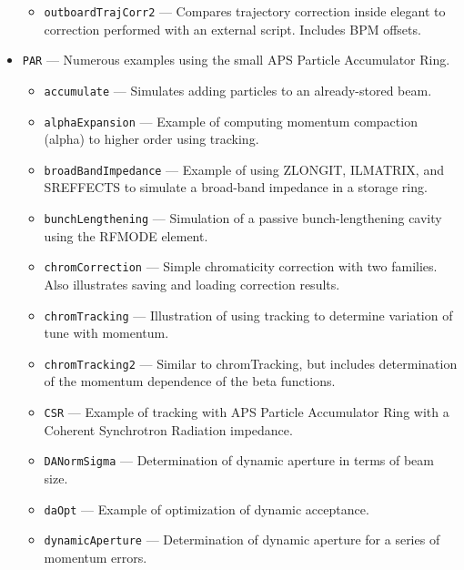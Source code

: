 \begin{itemize}
\begin{itemize}
\item \verb|outboardTrajCorr2| --- 
 Compares trajectory correction inside elegant to correction performed with an external script. Includes BPM offsets. 

\end{itemize}
\item \verb|PAR| --- 
 Numerous examples using the small APS Particle Accumulator Ring. 

\begin{itemize}
\item \verb|accumulate| --- 
Simulates adding particles to an already-stored beam.

\item \verb|alphaExpansion| --- 
Example of computing momentum compaction (alpha) to higher order using tracking.


\item \verb|broadBandImpedance| --- 
Example of using ZLONGIT, ILMATRIX, and SREFFECTS to
simulate a broad-band impedance in a storage ring.


\item \verb|bunchLengthening| --- 
 Simulation of a passive bunch-lengthening cavity using the RFMODE element. 

\item \verb|chromCorrection| --- 
 Simple chromaticity correction with two families. Also illustrates saving and loading correction results. 

\item \verb|chromTracking| --- 
 Illustration of using tracking to determine variation of tune with momentum. 

\item \verb|chromTracking2| --- 
 Similar to chromTracking, but includes determination of the momentum dependence of the beta functions. 

\item \verb|CSR| --- 
 Example of tracking with APS Particle Accumulator Ring with a Coherent Synchrotron Radiation impedance. 

\item \verb|DANormSigma| --- 
Determination of dynamic aperture in terms of beam size.


\item \verb|daOpt| --- 
Example of optimization of dynamic acceptance.

\item \verb|dynamicAperture| --- 
 Determination of dynamic aperture for a series of momentum errors. 


\end{itemize}
\end{itemize}
